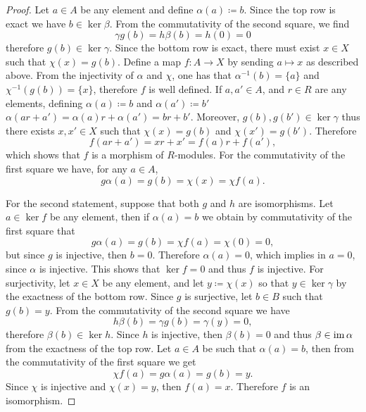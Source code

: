 \begin{proof}
Let \(a \in A\) be any element and define \(\alpha(a) \coloneq b\). Since the
top row is exact we have \(b \in \ker \beta\). From the commutativity of the
second square, we find
\[
\gamma g(b) = h \beta(b) = h(0) = 0
\]
therefore \(g(b) \in \ker \gamma\). Since the bottom row is exact, there must
exist \(x \in X\) such that \(\chi(x) = g(b)\). Define a map \(f: A \to X\) by
sending \(a \mapsto x\) as described above. From the injectivity of \(\alpha\)
and \(\chi\), one has that \(\alpha^{-1}(b) = \{a\}\) and
\(\chi^{-1}(g(b)) = \{x\}\), therefore \(f\) is well defined. If
\(a, a' \in A\), and \(r \in R\) are any elements, defining
\(\alpha(a) \coloneq b\) and \(\alpha(a') \coloneq b'\)
\(\alpha(a r + a') = \alpha(a) r + \alpha(a') = b r + b'\). Moreover,
\(g(b), g(b') \in \ker \gamma\) thus there exists \(x, x' \in X\) such that
\(\chi(x) = g(b)\) and \(\chi(x') = g(b')\). Therefore
\[
f(a r + a') = x r + x' = f(a) r + f(a'),
\]
which shows that \(f\) is a morphism of \(R\)-modules. For the commutativity of
the first square we have, for any \(a \in A\),
\[
g \alpha(a) = g(b) = \chi(x) = \chi f(a).
\]

For the second statement, suppose that both \(g\) and \(h\) are
isomorphisms. Let \(a \in \ker f\) be any element, then if \(\alpha(a) = b\) we
obtain by commutativity of the first square that
\[
g \alpha(a) = g(b) = \chi f(a) = \chi(0) = 0,
\]
but since \(g\) is injective, then \(b = 0\). Therefore \(\alpha(a) = 0\), which
implies in \(a = 0\), since \(\alpha\) is injective. This shows that \(\ker f =
0\) and thus \(f\) is injective. For surjectivity, let \(x \in X\) be any
element, and let \(y \coloneq \chi(x)\) so that \(y \in \ker \gamma\) by the
exactness of the bottom row. Since \(g\) is surjective, let \(b \in B\) such
that \(g(b) = y\). From the commutativity of the second square we have
\[
h \beta(b) = \gamma g(b) = \gamma(y) = 0,
\]
therefore \(\beta(b) \in \ker h\). Since \(h\) is injective, then
\(\beta(b) = 0\) and thus \(\beta \in \operatorname{im} \alpha\) from the exactness of the top
row. Let \(a \in A\) be such that \(\alpha(a) = b\), then from the commutativity
of the first square we get
\[
\chi f(a) = g \alpha(a) = g(b) = y.
\]
Since \(\chi\) is injective and \(\chi(x) = y\), then \(f(a) = x\). Therefore
\(f\) is an isomorphism.
\end{proof}

